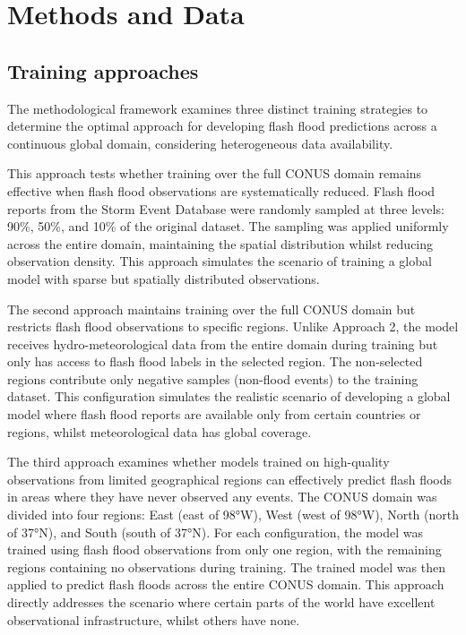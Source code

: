 

\section{Methods and Data}

\subsection{Training approaches}
The methodological framework examines three distinct training strategies to determine the optimal approach for developing flash flood predictions across a continuous global domain, considering heterogeneous data availability. 

This  approach tests whether training over the full CONUS domain remains effective when flash flood observations are systematically reduced. Flash flood reports from the Storm Event Database were randomly sampled at three levels: 90\%, 50\%, and 10\% of the original dataset. The sampling was applied uniformly across the entire domain, maintaining the spatial distribution whilst reducing observation density. This approach simulates the scenario of training a global model with sparse but spatially distributed observations.

The  second approach maintains training over the full CONUS domain but restricts flash flood observations to specific regions. Unlike Approach 2, the model receives hydro-meteorological data from the entire domain during training but only has access to flash flood labels in the selected region. The non-selected regions contribute only negative samples (non-flood events) to the training dataset. This configuration simulates the realistic scenario of developing a global model where flash flood reports are available only from certain countries or regions, whilst meteorological data has global coverage.

The  third approach examines whether models trained on high-quality observations from limited geographical regions can effectively predict flash floods in areas where they have never observed any events. The CONUS domain was divided into four regions: East (east of 98°W), West (west of 98°W), North (north of 37°N), and South (south of 37°N). For each configuration, the model was trained using flash flood observations from only one region, with the remaining regions containing no observations during training. The trained model was then applied to predict flash floods across the entire CONUS domain. This approach directly addresses the scenario where certain parts of the world have excellent observational infrastructure, whilst others have none.



